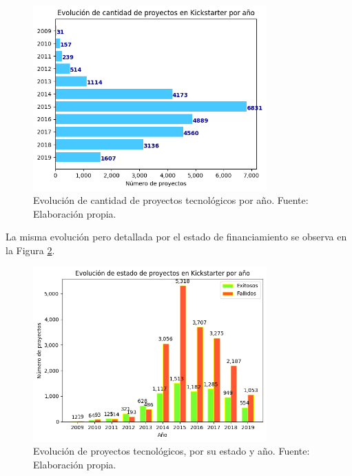 \begin{figure}[h]
	\begin{center}
		\includegraphics[width=0.8\textwidth]{4/figures/projects state by year.png}
		\caption{Evolución de cantidad de proyectos tecnológicos por año. Fuente: Elaboración propia.}
		\label{4:fig2}
	\end{center}
\end{figure}


La misma evolución pero detallada por el estado de financiamiento se observa en la Figura \ref{4:fig3}.

\begin{figure}[h]
	\begin{center}
		\includegraphics[width=0.8\textwidth]{4/figures/projects state evolution by year.png}
		\caption{Evolución de proyectos tecnológicos, por su estado y año. Fuente: Elaboración propia.}
		\label{4:fig3}
	\end{center}
\end{figure}

